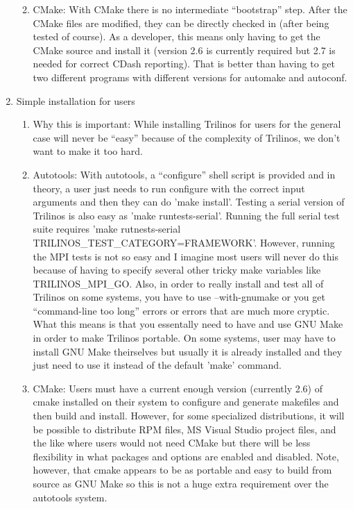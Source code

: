 \documentclass[pdf,ps2pdf,11pt]{SANDreport}
\begin{document}
\begin{enumerate}
\begin{enumerate}
  {}\item CMake: With CMake there is no intermediate ``bootstrap''
  step.  After the CMake files are modified, they can be directly
  checked in (after being tested of course).  As a developer, this
  means only having to get the CMake source and install it (version
  2.6 is currently required but 2.7 is needed for correct CDash
  reporting).  That is better than having to get two different
  programs with different versions for automake and autoconf.

  \end{enumerate}

{}\item Simple installation for users

  \begin{enumerate}

  {}\item Why this is important: While installing Trilinos for users
  for the general case will never be ``easy'' because of the
  complexity of Trilinos, we don't want to make it too hard.

  {}\item Autotools: With autotools, a ``configure'' shell script is
  provided and in theory, a user just needs to run configure with the
  correct input arguments and then they can do 'make install'.
  Testing a serial version of Trilinos is also easy as 'make
  runtests-serial'.  Running the full serial test suite requires 'make
  rutnests-serial TRILINOS\_TEST\_CATEGORY=FRAMEWORK'.  However,
  running the MPI tests is not so easy and I imagine most users will
  never do this because of having to specify several other tricky make
  variables like TRILINOS\_MPI\_GO.  Also, in order to really install
  and test all of Trilinos on some systems, you have to use
  --with-gnumake or you get ``command-line too long'' errors or errors
  that are much more cryptic.  What this means is that you essentally
  need to have and use GNU Make in order to make Trilinos portable.
  On some systems, user may have to install GNU Make theirselves but
  usually it is already installed and they just need to use it instead
  of the default 'make' command.

  {}\item CMake: Users must have a current enough version (currently
  2.6) of cmake installed on their system to configure and generate
  makefiles and then build and install.  However, for some specialized
  distributions, it will be possible to distribute RPM files, MS
  Visual Studio project files, and the like where users would not need
  CMake but there will be less flexibility in what packages and
  options are enabled and disabled.  Note, however, that cmake appears
  to be as portable and easy to build from source as GNU Make so this
  is not a huge extra requirement over the autotools system.

  \end{enumerate}

\end{enumerate}
\end{document}
